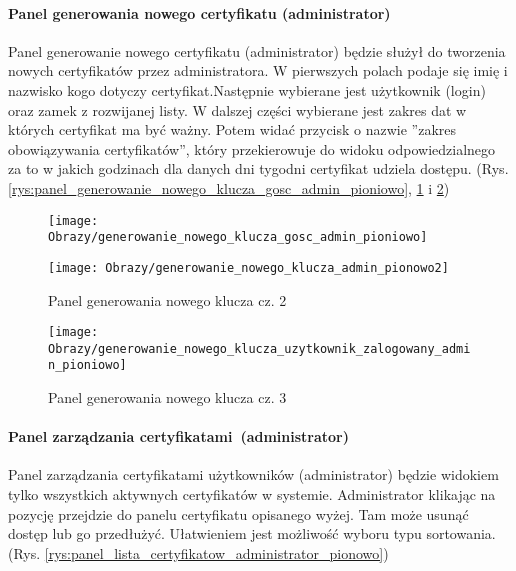 	\paragraph*{Panel generowania nowego certyfikatu (administrator)}
	Panel generowanie nowego certyfikatu (administrator) będzie służył do tworzenia nowych certyfikatów przez administratora. W pierwszych polach podaje się imię i nazwisko kogo dotyczy certyfikat.Następnie wybierane jest użytkownik (login) oraz zamek z rozwijanej listy. W dalszej części wybierane jest zakres dat w których certyfikat ma być ważny. Potem widać przycisk o nazwie ''zakres obowiązywania certyfikatów'', który przekierowuje do widoku odpowiedzialnego za to w jakich godzinach dla danych dni tygodni certyfikat udziela dostępu. (Rys. \ref{rys:panel_generowanie_nowego_klucza_gosc_admin_pioniowo}, \ref{rys:panel_generowanie_nowego_klucza_admin_pionowo2} i 
	\ref{rys:panel_wyboru_zakresu_certyfikatu})
	
	\vspace{-0.3cm}
	\begin{figure}[ht!]
		\begin{minipage}{0.35\textwidth}
			\texttt{[image: Obrazy/generowanie\_nowego\_klucza\_gosc\_admin\_pioniowo]}
			\caption{Panel generowania nowego klucza cz. 1 }
			\label{rys:panel_generowanie_nowego_klucza_gosc_admin_pioniowo}
		\end{minipage}
		\hspace{0.3\textwidth}
		\begin{minipage}{0.35\textwidth}
			\texttt{[image: Obrazy/generowanie\_nowego\_klucza\_admin\_pionowo2]}
			\caption{Panel generowania nowego klucza cz. 2}
			\label{rys:panel_generowanie_nowego_klucza_admin_pionowo2}	
		\end{minipage}
	\end{figure}
	\vspace{-0.55cm}
	\begin{figure}[ht!]
		\center
			\texttt{[image: Obrazy/generowanie\_nowego\_klucza\_uzytkownik\_zalogowany\_admin\_pioniowo]}
			\caption{Panel generowania nowego klucza cz. 3}
			\label{rys:panel_wyboru_zakresu_certyfikatu}
	\end{figure}
\newpage
	
	\paragraph*{Panel zarządzania certyfikatami~(administrator)}
	Panel zarządzania certyfikatami użytkowników (administrator) będzie widokiem tylko wszystkich aktywnych certyfikatów w systemie. Administrator klikając na pozycję przejdzie do panelu certyfikatu opisanego wyżej. Tam może usunąć dostęp lub go przedłużyć. Ułatwieniem jest możliwość wyboru typu sortowania. (Rys. \ref{rys:panel_lista_certyfikatow_administrator_pionowo})
	
